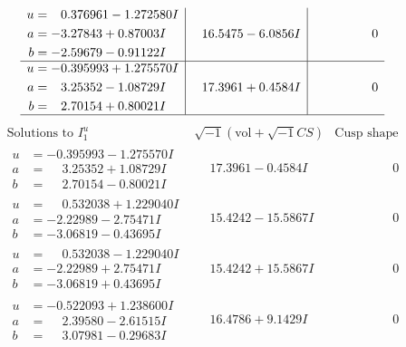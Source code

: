 \documentclass[1p]{elsarticle_modified}
\theoremstyle{definition}
\newcommand{\I}{\sqrt{-1}}
\begin{document}
$$\begin{array}{c|c|c}
\begin{aligned}
u &= \phantom{-}0.376961 - 1.272580 I \\
a &= -3.27843 + 0.87003 I \\
b &= -2.59679 - 0.91122 I\end{aligned}
 & \phantom{-}16.5475 - 6.0856 I & \phantom{-0.000000 } 0 \\ \hline\begin{aligned}
u &= -0.395993 + 1.275570 I \\
a &= \phantom{-}3.25352 - 1.08729 I \\
b &= \phantom{-}2.70154 + 0.80021 I\end{aligned}
 & \phantom{-}17.3961 + 0.4584 I & \phantom{-0.000000 } 0\\
 \hline 
 \end{array}$$\newpage$$\begin{array}{c|c|c}  
\text{Solutions to }I^u_{1}& \I (\text{vol} + \sqrt{-1}CS) & \text{Cusp shape}\\
 \hline 
\begin{aligned}
u &= -0.395993 - 1.275570 I \\
a &= \phantom{-}3.25352 + 1.08729 I \\
b &= \phantom{-}2.70154 - 0.80021 I\end{aligned}
 & \phantom{-}17.3961 - 0.4584 I & \phantom{-0.000000 } 0 \\ \hline\begin{aligned}
u &= \phantom{-}0.532038 + 1.229040 I \\
a &= -2.22989 - 2.75471 I \\
b &= -3.06819 - 0.43695 I\end{aligned}
 & \phantom{-}15.4242 - 15.5867 I & \phantom{-0.000000 } 0 \\ \hline\begin{aligned}
u &= \phantom{-}0.532038 - 1.229040 I \\
a &= -2.22989 + 2.75471 I \\
b &= -3.06819 + 0.43695 I\end{aligned}
 & \phantom{-}15.4242 + 15.5867 I & \phantom{-0.000000 } 0 \\ \hline\begin{aligned}
u &= -0.522093 + 1.238600 I \\
a &= \phantom{-}2.39580 - 2.61515 I \\
b &= \phantom{-}3.07981 - 0.29683 I\end{aligned}
 & \phantom{-}16.4786 + 9.1429 I & \phantom{-0.000000 } 0 \\ \hline\begin{aligned}

\end{aligned}
\end{array}$$
\end{document}
